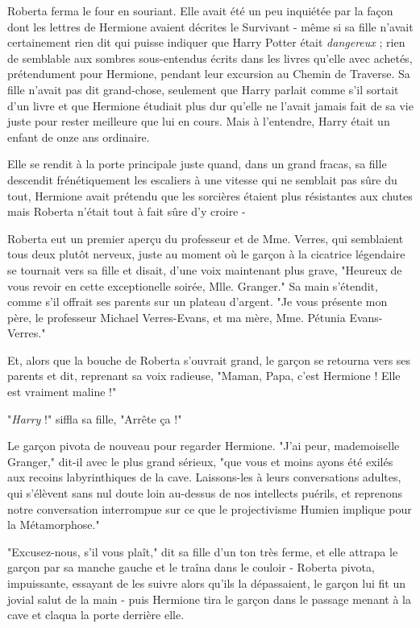 Roberta ferma le four en souriant. Elle avait été un peu inquiétée par la façon dont les lettres de Hermione avaient décrites le Survivant - même si sa fille n'avait certainement rien dit qui puisse indiquer que Harry Potter était \emph{dangereux}  ; rien de semblable aux sombres sous-entendus écrits dans les livres qu'elle avec achetés, prétendument pour Hermione, pendant leur excursion au Chemin de Traverse. Sa fille n'avait pas dit grand-chose, seulement que Harry parlait comme s'il sortait d'un livre et que Hermione étudiait plus dur qu'elle ne l'avait jamais fait de sa vie juste pour rester meilleure que lui en cours. Mais à l'entendre, Harry était un enfant de onze ans ordinaire.

Elle se rendit à la porte principale juste quand, dans un grand fracas, sa fille descendit frénétiquement les escaliers à une vitesse qui ne semblait pas sûre du tout, Hermione avait prétendu que les sorcières étaient plus résistantes aux chutes mais Roberta n'était tout à fait sûre d'y croire -

Roberta eut un premier aperçu du professeur et de Mme. Verres, qui semblaient tous deux plutôt nerveux, juste au moment où le garçon à la cicatrice légendaire se tournait vers sa fille et disait, d'une voix maintenant plus grave, "Heureux de vous revoir en cette exceptionelle soirée, Mlle. Granger." Sa main s'étendit, comme s'il offrait ses parents sur un plateau d'argent. "Je vous présente mon père, le professeur Michael Verres-Evans, et ma mère, Mme. Pétunia Evans-Verres."

Et, alors que la bouche de Roberta s'ouvrait grand, le garçon se retourna vers ses parents et dit, reprenant sa voix radieuse, "Maman, Papa, c'est Hermione ! Elle est vraiment maline !"

"\emph{Harry } !" siffla sa fille, "Arrête ça !"

Le garçon pivota de nouveau pour regarder Hermione. "J'ai peur, mademoiselle Granger," dit-il avec le plus grand sérieux, "que vous et moins ayons été exilés aux recoins labyrinthiques de la cave. Laissons-les à leurs conversations adultes, qui s'élèvent sans nul doute loin au-dessus de nos intellects puérils, et reprenons notre conversation interrompue sur ce que le projectivisme Humien implique pour la Métamorphose."

"Excusez-nous, s'il vous plaît," dit sa fille d'un ton très ferme, et elle attrapa le garçon par sa manche gauche et le traîna dans le couloir - Roberta pivota, impuissante, essayant de les suivre alors qu'ils la dépassaient, le garçon lui fit un jovial salut de la main - puis Hermione tira le garçon dans le passage menant à la cave et claqua la porte derrière elle.

